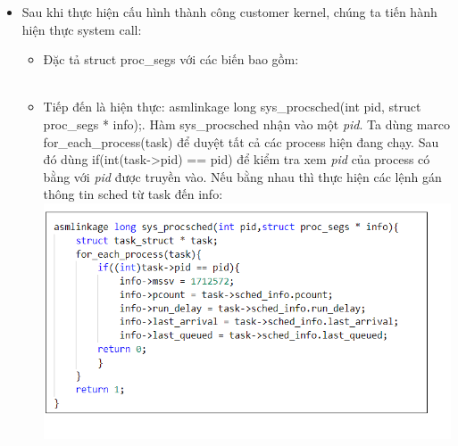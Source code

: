 \documentclass[a4paper]{article}
\begin{document}
\begin{itemize}
\item Sau khi thực hiện cấu hình thành công customer kernel, chúng ta tiến hành hiện thực system call:
    \begin{itemize}
        \item Đặc tả {\color{blue}struct} proc\_segs với các biến bao gồm:\\
        \\
\item Tiếp đến là hiện thực: asmlinkage {\color{blue}long} sys\_procsched({\color{blue}int} pid, {\color{blue}struct} proc\_segs
* info);. Hàm sys\_procsched nhận vào một \textit{pid}. Ta dùng marco for\_each\_process(task) để duyệt tất cả các process hiện đang chạy. Sau đó dùng if({\color{blue}int}(task->pid) == pid) để kiểm tra xem \textit{pid} của process có bằng với \textit{pid} được truyền vào. Nếu bằng nhau thì thực hiện các lệnh gán thông tin sched từ task đến info:\\
     \includegraphics[scale=1.00]{Capture.PNG}
    \end{itemize}
\end{itemize}
\newpage
\end{document}
